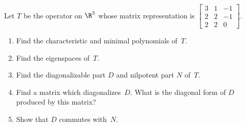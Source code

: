 \begin{exer} Let $T$ be the operator on $\R^3$ whose matrix representation is
 $\begin{bmatrix}
        3  &  1  & -1 \\
        2  &  2  & -1 \\
        2  &  2  &  0
  \end{bmatrix}$.

 \begin{enumerate}
  \item Find the characteristic and minimal polynomials of~$T$.
  \item Find the eigenspaces of~$T$.
  \item Find the diagonalizable part $D$ and nilpotent part $N$ of~$T$.
  \item Find a matrix which diagonalizes~$D$. What is the diagonal form
of $D$ produced by this matrix?
  \item Show that $D$ commutes with~$N$.
 \end{enumerate}
\end{exer}














